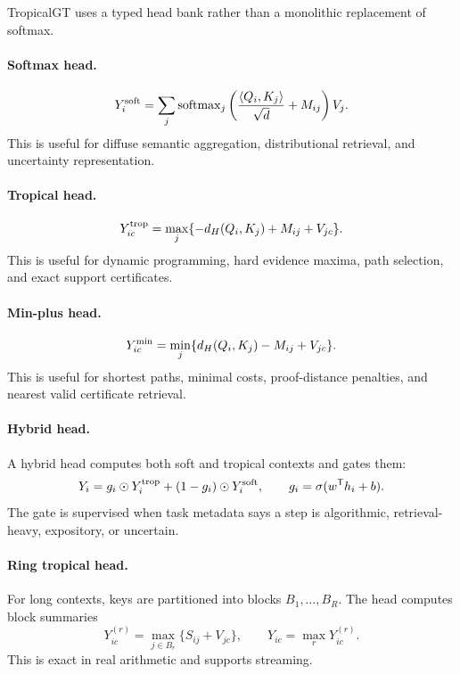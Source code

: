 \documentclass[11pt]{article}
\newcommand{\softmax}{\operatorname{softmax}}
\newcommand{\ip}[2]{\left\langle #1,#2\right\rangle}
\newcommand{\trans}{^{\mathsf T}}
\begin{document}
TropicalGT uses a typed head bank rather than a monolithic replacement of softmax.

\paragraph{Softmax head.}
\begin{equation}
Y_i^{\rm soft}=\sum_j \softmax_j\left(\frac{\ip{Q_i}{K_j}}{\sqrt d}+M_{ij}\right)V_j.
\end{equation}
This is useful for diffuse semantic aggregation, distributional retrieval, and uncertainty representation.

\paragraph{Tropical head.}
\begin{equation}
Y_{ic}^{\rm trop}=\max_j\{-d_H(Q_i,K_j)+M_{ij}+V_{jc}\}.
\end{equation}
This is useful for dynamic programming, hard evidence maxima, path selection, and exact support certificates.

\paragraph{Min-plus head.}
\begin{equation}
Y_{ic}^{\rm min}=\min_j\{d_H(Q_i,K_j)-M_{ij}+V_{jc}\}.
\end{equation}
This is useful for shortest paths, minimal costs, proof-distance penalties, and nearest valid certificate retrieval.

\paragraph{Hybrid head.}
A hybrid head computes both soft and tropical contexts and gates them:
\begin{equation}
Y_i=g_i\odot Y_i^{\rm trop}+(1-g_i)\odot Y_i^{\rm soft},\qquad g_i=\sigma(w\trans h_i+b).
\end{equation}
The gate is supervised when task metadata says a step is algorithmic, retrieval-heavy, expository, or uncertain.

\paragraph{Ring tropical head.}
For long contexts, keys are partitioned into blocks \(B_1,\ldots,B_R\).  The head computes block summaries
\begin{equation}
Y_{ic}^{(r)}=\max_{j\in B_r}\{S_{ij}+V_{jc}\},\qquad Y_{ic}=\max_r Y_{ic}^{(r)}.
\end{equation}
This is exact in real arithmetic and supports streaming.
\end{document}
